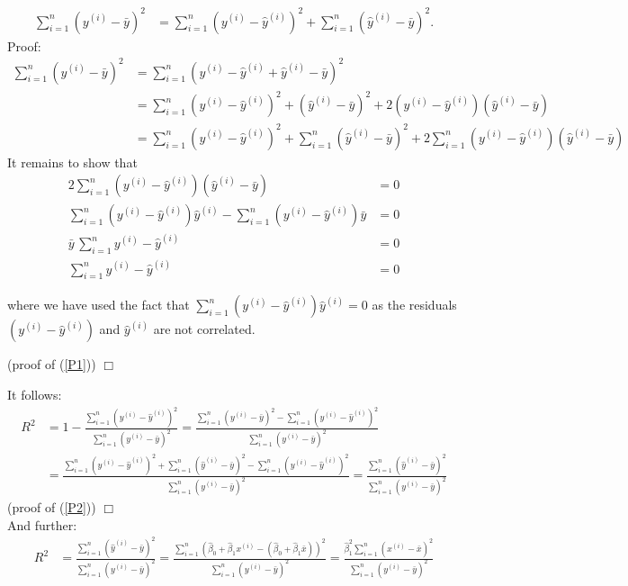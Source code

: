 {{{\begin{align} \label{P1}
	\sum_{i=1}^n (y^{(i)}-\bar{y})^2 &= \sum_{i=1}^n (y^{(i)}-\hat{y}^{(i)})^2 + \sum_{i=1}^n (\hat{y}^{(i)} - \bar{y})^2.
\end{align}
Proof: 
\begin{align*}
	\sum_{i=1}^n (y^{(i)}-\bar{y})^2 
	&= \sum_{i=1}^n (y^{(i)} - \hat{y}^{(i)} + \hat{y}^{(i)} - \bar{y})^2 \\
	&= \sum_{i=1}^n (y^{(i)} - \hat{y}^{(i)})^2 + (\hat{y}^{(i)} - \bar{y})^2 + 2(y^{(i)}-\hat{y}^{(i)})(\hat{y}^{(i)} - \bar{y}) \\
	&= \sum_{i=1}^n (y^{(i)} - \hat{y}^{(i)})^2 + \sum_{i=1}^n(\hat{y}^{(i)} - \bar{y})^2 + 2\sum_{i=1}^n(y^{(i)}-\hat{y}^{(i)})(\hat{y}^{(i)} - \bar{y})
\end{align*}
It remains to show that 
\begin{align*}
	2\sum_{i=1}^n(y^{(i)}-\hat{y}^{(i)})(\hat{y}^{(i)} - \bar{y}) &= 0 \\
	\sum_{i=1}^n (y^{(i)}-\hat{y}^{(i)})\hat{y}^{(i)} - \sum_{i=1}^n (y^{(i)}-\hat{y}^{(i)})\bar{y}&= 0 \\
	\bar{y}\, \sum_{i=1}^n y^{(i)}-\hat{y}^{(i)} &= 0 \\
	\sum_{i=1}^n y^{(i)}-\hat{y}^{(i)} &= 0
\end{align*}

where we have used the fact that $\sum_{i=1}^n (y^{(i)}-\hat{y}^{(i)})\hat{y}^{(i)} = 0$ as the residuals $(y^{(i)}-\hat{y}^{(i)})$ and $\hat{y}^{(i)}$ are not correlated. 

\hfill (proof of (\ref{P1})) $\Box$ \\
}}

\bigskip

It follows: 
\begin{align*}
	R^2 &=  1 - \frac{\sum_{i=1}^n (y^{(i)} - \hat{y}^{(i)})^2}{\sum_{i=1}^n (y^{(i)} - \bar{y})^2} 
	= \frac{\sum_{i=1}^n (y^{(i)} - \bar{y})^2 - \sum_{i=1}^n (y^{(i)} - \hat{y}^{(i)})^2}{\sum_{i=1}^n (y^{(i)} - \bar{y})^2}\\
	&= \frac{\sum_{i=1}^n (y^{(i)}-\hat{y}^{(i)})^2 + \sum_{i=1}^n (\hat{y}^{(i)} - \bar{y})^2 - \sum_{i=1}^n (y^{(i)} - \hat{y}^{(i)})^2}{\sum_{i=1}^n (y^{(i)} - \bar{y})^2}
	= \frac{\sum_{i=1}^n (\hat{y}^{(i)} - \bar{y})^2}{\sum_{i=1}^n (y^{(i)} - \bar{y})^2}
\end{align*}
\hfill (proof of (\ref{P2})) $\Box$ \\ 

And further: 
\begin{align*}
	R^2 &= \frac{\sum_{i=1}^n (\hat{y}^{(i)} - \bar{y})^2}{\sum_{i=1}^n (y^{(i)} - \bar{y})^2}
	= \frac{\sum_{i=1}^n(\hat{\beta}_0 + \hat{\beta}_1 x^{(i)}- (\hat{\beta}_0 + \hat{\beta}_1 \bar{x}))^2}{\sum_{i=1}^n (y^{(i)} - \bar{y})^2}
	= \frac{\hat{\beta}_1^2 \sum_{i=1}^n (x^{(i)} - \bar{x})^2}{\sum_{i=1}^n (y^{(i)} - \bar{y})^2} 
\end{align*}

}

